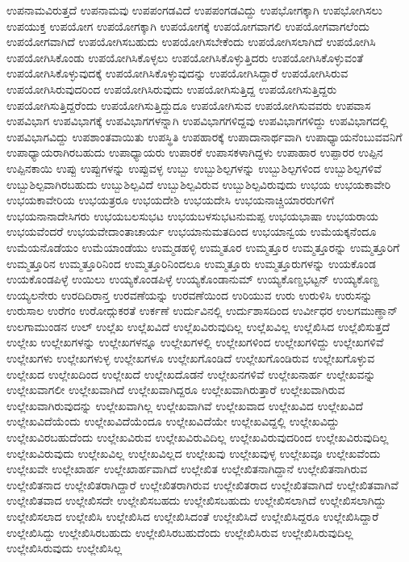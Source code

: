 {ಉಪನಾಮವಿರುತ್ತದೆ
ಉಪನಾಮವು
ಉಪಪಂಗಡವಿದೆ
ಉಪಪಂಗಡವಿದ್ದು
ಉಪಭೋಗಕ್ಕಾಗಿ
ಉಪಭೋಗಿಸಲು
ಉಪಯುಕ್ತ
ಉಪಯೋಗ
ಉಪಯೋಗಕ್ಕಾಗಿ
ಉಪಯೋಗಕ್ಕೆ
ಉಪಯೋಗವಾಗಲಿ
ಉಪಯೋಗವಾಗಲೆಂದು
ಉಪಯೋಗವಾಗಿದೆ
ಉಪಯೋಗಿಸಬಹುದು
ಉಪಯೋಗಿಸಬೇಕೆಂದು
ಉಪಯೋಗಿಸಲಾಗಿದೆ
ಉಪಯೋಗಿಸಿ
ಉಪಯೋಗಿಸಿಕೊಂಡು
ಉಪಯೋಗಿಸಿಕೊಳ್ಳಲು
ಉಪಯೋಗಿಸಿಕೊಳ್ಳುತ್ತಿದರು
ಉಪಯೋಗಿಸಿಕೊಳ್ಳುವಂತೆ
ಉಪಯೋಗಿಸಿಕೊಳ್ಳುವುದಕ್ಕೆ
ಉಪಯೋಗಿಸಿಕೊಳ್ಳುವುದನ್ನು
ಉಪಯೋಗಿಸಿದ್ದಾರೆ
ಉಪಯೋಗಿಸಿರುವ
ಉಪಯೋಗಿಸಿರುವುದರಿಂದ
ಉಪಯೋಗಿಸಿರುವುದು
ಉಪಯೋಗಿಸುತ್ತಿದ್ದ
ಉಪಯೋಗಿಸುತ್ತಿದ್ದರು
ಉಪಯೋಗಿಸುತ್ತಿದ್ದರೆಂದು
ಉಪಯೋಗಿಸುತ್ತಿದ್ದುದೂ
ಉಪಯೋಗಿಸುವ
ಉಪಯೋಗಿಸುವವರು
ಉಪವಾಸ
ಉಪವಿಭಾಗ
ಉಪವಿಭಾಗಕ್ಕೆ
ಉಪವಿಭಾಗಗಳನ್ನಾಗಿ
ಉಪವಿಭಾಗಗಳಿದ್ದವು
ಉಪವಿಭಾಗಗಳಿದ್ದು
ಉಪವಿಭಾಗದಲ್ಲಿ
ಉಪವಿಭಾಗವಿದ್ದು
ಉಪಶಾಂತವಾಯಿತು
ಉಪಸ್ಥಿತಿ
ಉಪಹಾರಕ್ಕೆ
ಉಪಾದಾನಾರ್ಥವಾಗಿ
ಉಪಾಧ್ಯಾಯನೆಂಬುವವನಿಗೆ
ಉಪಾಧ್ಯಾಯರಾಗಿರಬಹುದು
ಉಪಾಧ್ಯಾಯರು
ಉಪಾರಕೆ
ಉಪಾಸಕಳಾಗಿದ್ದಳು
ಉಪಾಹಾರ
ಉಪ್ಪಾರರ
ಉಪ್ಪಿನ
ಉಪ್ಪಿನಕಾಯಿ
ಉಪ್ಪು
ಉಪ್ಪುಗಳನ್ನು
ಉಪ್ಪುವಳ್ಳ
ಉಬ್ಬು
ಉಬ್ಬುಶಿಲ್ಪಗಳನ್ನು
ಉಬ್ಬುಶಿಲ್ಪಗಳಿಂದ
ಉಬ್ಬುಶಿಲ್ಪಗಳಿವೆ
ಉಬ್ಬುಶಿಲ್ಪವಾಗಿರಬಹುದು
ಉಬ್ಬುಶಿಲ್ಪವಿದೆ
ಉಬ್ಬುಶಿಲ್ಪವಿರುವ
ಉಬ್ಬುಶಿಲ್ಪವಿರುವುದು
ಉಭಯ
ಉಭಯಕಾವೇರಿ
ಉಭಯಕಾವೇರಿಯ
ಉಭಯತ್ರರೂ
ಉಭಯದೇಶಿ
ಉಭಯದೇಸಿ
ಉಭಯನಾಚ್ಚಿಯಾರರುಗಳಿಗೆ
ಉಭಯನಾನಾದೇಸಿಗರು
ಉಭಯಬಲಸುಭಟ
ಉಭಯಬಳಸುಭಟನುಮಪ್ಪ
ಉಭಯಭಾಷಾ
ಉಭಯರಾಯ
ಉಭಯವೆಂದರೆ
ಉಭಯವೇದಾಂತಾಚಾರ್ಯ
ಉಭಯಾನುಮತದಿಂದ
ಉಭಯಾನ್ವಯ
ಉಮೆಯಕ್ಕನೆಂದೂ
ಉಮೆಯನೊಡೆಯಂ
ಉಮೆಯಾಂಡೆಯು
ಉಮ್ಮಡಹಳ್ಳಿ
ಉಮ್ಮತೂರ
ಉಮ್ಮತ್ತೂರ
ಉಮ್ಮತ್ತೂರನ್ನು
ಉಮ್ಮತ್ತೂರಿಗೆ
ಉಮ್ಮತ್ತೂರಿನ
ಉಮ್ಮತ್ತೂರಿನಿಂದ
ಉಮ್ಮತ್ತೂರಿನಿಂದಲೂ
ಉಮ್ಮತ್ತೂರು
ಉಮ್ಮತ್ತೂರುಗಳನ್ನು
ಉಯಕೊಂಡ
ಉಯಕೊಂಡಪಿಳ್ಳೆ
ಉಯಿಲು
ಉಯ್ಯಕೊಂಡಪಿಳ್ಳೆ
ಉಯ್ಯಕೊಂಡಾನುಮ್
ಉಯ್ಯಕೊಣ್ಡಭಟ್ಟನ್
ಉಯ್ಯಕೊಣ್ದ
ಉಯ್ಯಲನೇರು
ಉರದಿದಿರಾನ್ತ
ಉರವಣೆಯನ್ನು
ಉರವಣೆಯಿಂದ
ಉರಿಯುವ
ಉರು
ಉರುಳಿಸಿ
ಉರುಸನ್ನು
ಉರುಸಾಲ
ಉರೆಗಂ
ಉರೋದ್ಗುಕರತೆ
ಉರ್ಕಣೆ
ಉರ್ದುವಿನಲ್ಲಿ
ಉರ್ದುಶಾಸದಿಂದ
ಉರ್ವೀಧರ
ಉಲಗಮುಣ್ಢಾನ್
ಉಲಗಾಮುಂಡನ
ಉಲ್
ಉಲ್ಲೆಖ
ಉಲ್ಲೆಖವಿದೆ
ಉಲ್ಲೆಖವಿರುವುದಿಲ್ಲ
ಉಲ್ಲೆಖವಿಲ್ಲ
ಉಲ್ಲೆಖಿಸಿದ
ಉಲ್ಲೆಖಿಸುತ್ತದೆ
ಉಲ್ಲೇಖ
ಉಲ್ಲೇಖಗಳನ್ನು
ಉಲ್ಲೇಖಗಳನ್ನೂ
ಉಲ್ಲೇಖಗಳಲ್ಲಿ
ಉಲ್ಲೇಖಗಳಿಂದ
ಉಲ್ಲೇಖಗಳಿದ್ದು
ಉಲ್ಲೇಖಗಳಿವೆ
ಉಲ್ಲೇಖಗಳು
ಉಲ್ಲೇಖಗಳುಳ್ಳ
ಉಲ್ಲೇಖಗಳೂ
ಉಲ್ಲೇಖಗೊಂಡಿದೆ
ಉಲ್ಲೇಖಗೊಂಡಿರುವ
ಉಲ್ಲೇಖಗೊಳ್ಳುವ
ಉಲ್ಲೇಖದ
ಉಲ್ಲೇಖದಿಂದ
ಉಲ್ಲೇಖದೆ
ಉಲ್ಲೇಖದೊಡನೆ
ಉಲ್ಲೇಖನಗಳಿವೆ
ಉಲ್ಲೇಖನಾರ್ಹ
ಉಲ್ಲೇಖವನ್ನು
ಉಲ್ಲೇಖವಾಗಲೀ
ಉಲ್ಲೇಖವಾಗಿದೆ
ಉಲ್ಲೇಖವಾಗಿದ್ದರೂ
ಉಲ್ಲೇಖವಾಗಿರುತ್ತಾರೆ
ಉಲ್ಲೇಖವಾಗಿರುವ
ಉಲ್ಲೇಖವಾಗಿರುವುದನ್ನು
ಉಲ್ಲೇಖವಾಗಿಲ್ಲ
ಉಲ್ಲೇಖವಾಗಿವೆ
ಉಲ್ಲೇಖವಾದ
ಉಲ್ಲೇಖವಿದ
ಉಲ್ಲೇಖವಿದೆ
ಉಲ್ಲೇಖವಿದೆಯೆಂದು
ಉಲ್ಲೇಖವಿದೆಯೆಂದೂ
ಉಲ್ಲೇಖವಿದೆಯೇ
ಉಲ್ಲೇಖವಿದ್ದಲ್ಲಿ
ಉಲ್ಲೇಖವಿದ್ದು
ಉಲ್ಲೇಖವಿರಬಹುದೆಂದು
ಉಲ್ಲೇಖವಿರುವ
ಉಲ್ಲೇಖವಿರುವಿದಿಲ್ಲ
ಉಲ್ಲೇಖವಿರುವುದರಿಂದ
ಉಲ್ಲೇಖವಿರುವುದಿಲ್ಲ
ಉಲ್ಲೇಖವಿರುವುದು
ಉಲ್ಲೇಖವಿಲ್ಲ
ಉಲ್ಲೇಖವಿಲ್ಲದ
ಉಲ್ಲೇಖವು
ಉಲ್ಲೇಖವುಳ್ಳ
ಉಲ್ಲೇಖವೂ
ಉಲ್ಲೇಖವೆಂದು
ಉಲ್ಲೇಖವೇ
ಉಲ್ಲೇಖಾರ್ಹ
ಉಲ್ಲೇಖಾರ್ಹವಾಗಿದೆ
ಉಲ್ಲೇಖಿತ
ಉಲ್ಲೇಖಿತನಾಗಿದ್ದಾನೆ
ಉಲ್ಲೇಖಿತನಾಗಿರುವ
ಉಲ್ಲೇಖಿತನಾದ
ಉಲ್ಲೇಖಿತರಾಗಿದ್ದಾರೆ
ಉಲ್ಲೇಖಿತರಾಗಿರುವ
ಉಲ್ಲೇಖಿತರಾದ
ಉಲ್ಲೇಖಿತವಾಗಿದೆ
ಉಲ್ಲೇಖಿತವಾಗಿವೆ
ಉಲ್ಲೇಖಿತವಾದ
ಉಲ್ಲೇಖಿಸದೇ
ಉಲ್ಲೇಖಿಸಬಹದು
ಉಲ್ಲೇಖಿಸಬಹುದು
ಉಲ್ಲೇಖಿಸಲಾಗಿದೆ
ಉಲ್ಲೇಖಿಸಲಾಗಿದ್ದು
ಉಲ್ಲೇಖಿಸಲಾದ
ಉಲ್ಲೇಖಿಸಿ
ಉಲ್ಲೇಖಿಸಿದ
ಉಲ್ಲೇಖಿಸಿದಂತೆ
ಉಲ್ಲೇಖಿಸಿದೆ
ಉಲ್ಲೇಖಿಸಿದ್ದರೂ
ಉಲ್ಲೇಖಿಸಿದ್ದಾರೆ
ಉಲ್ಲೇಖಿಸಿದ್ದು
ಉಲ್ಲೇಖಿಸಿರಬಹುದು
ಉಲ್ಲೇಖಿಸಿರಬಹುದೆಂದು
ಉಲ್ಲೇಖಿಸಿರುವ
ಉಲ್ಲೇಖಿಸಿರುವುದಿಲ್ಲ
ಉಲ್ಲೇಖಿಸಿರುವುದು
ಉಲ್ಲೇಖಿಸಿಲ್ಲ
}
